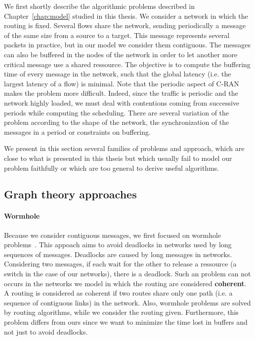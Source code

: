  We first shortly describe the algorithmic problems described in Chapter~\ref{chap:model} studied in this thesis. We consider a network in which the routing is fixed. Several flows share the network, sending periodically a message of the same size from a source to a target. This message represents several packets in practice, but in our model we consider them contiguous. The messages can also be buffered in the nodes of the network in order to let another more critical message use a shared ressource. The objective is to compute the buffering time of every message in the network, such that the global latency (i.e. the largest latency of a flow) is minimal. Note that the periodic aspect of C-RAN makes the problem more difficult. Indeed, since the traffic is periodic and the network highly loaded, we must deal with contentions coming from successive periods while computing the scheduling. There are several variation of the problem according to the shape of the network, the synchronization of the messages in a period or constraints on buffering.
 
 We present in this section several families of problems and approach, which are close to what is presented in this thseis but which
 usually fail to model our problem faithfully or which are too general to derive useful algorithms.


\subsection{Graph theory approaches}

\paragraph{Wormhole}
Because we consider contiguous messages, we first focused on wormhole problems~\cite{ni1993survey,cole1996benefit}. This appoach aims to avoid deadlocks in networks used by long sequences of messages. Deadlocks are caused by long messages in networks. Considering two messages, if each wait for the other to release a ressource (a switch in the case of our networks), there is a deadlock. Such an problem can not occurs in the networks we model in which the routing are considered \textbf{coherent}\cite{Schwiebert1996ANA}. A routing is considered as coherent if two routes share only one path (i.e. a sequence of contiguous links) in the network.
 Also, wormhole problems are solved by routing algorithms, while we consider the routing given. Furthermore, this problem differs from ours since we want to minimize the time lost in buffers and not just to avoid deadlocks. 

